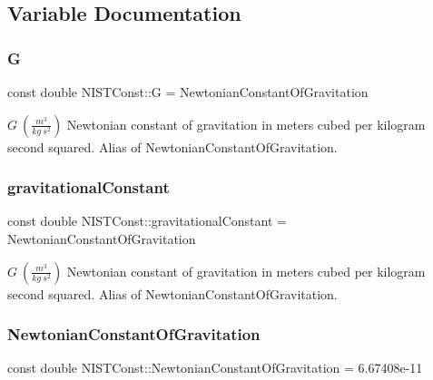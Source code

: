 \subsection{Variable Documentation}
\mbox{\label{group___gravitational_constant_gad3f54a7cdc3ea6fd2fbc4a30ce7df201}} 
\subsubsection{\texorpdfstring{G}{G}}
{\footnotesize\ttfamily const double N\+I\+S\+T\+Const\+::G = Newtonian\+Constant\+Of\+Gravitation}

$G \ (\frac{m^3}{kg\ s^2})$ Newtonian constant of gravitation in meters cubed per kilogram second squared. Alias of Newtonian\+Constant\+Of\+Gravitation. \mbox{\label{group___gravitational_constant_ga5a77947aedbfa6b29249f5b25f22137b}} 
\subsubsection{\texorpdfstring{gravitational\+Constant}{gravitationalConstant}}
{\footnotesize\ttfamily const double N\+I\+S\+T\+Const\+::gravitational\+Constant = Newtonian\+Constant\+Of\+Gravitation}

$G \ (\frac{m^3}{kg\ s^2})$ Newtonian constant of gravitation in meters cubed per kilogram second squared. Alias of Newtonian\+Constant\+Of\+Gravitation. \mbox{\label{group___gravitational_constant_gaba6371307f4cebde50b3c61a07c724c5}} 
\subsubsection{\texorpdfstring{Newtonian\+Constant\+Of\+Gravitation}{NewtonianConstantOfGravitation}}
{\footnotesize\ttfamily const double N\+I\+S\+T\+Const\+::\+Newtonian\+Constant\+Of\+Gravitation = 6.\+67408e-\/11}

